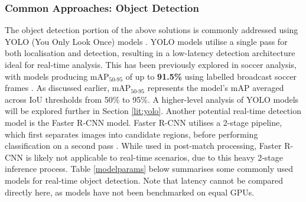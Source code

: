 \subsubsection{Common Approaches: Object Detection}
\label{subsubsec:object}
The object detection portion of the above solutions is commonly addressed using YOLO (You Only Look Once) models \cite{Redmon_2016_CVPR}. YOLO models utilise a single pass for both localisation and detection, resulting in a low-latency detection architecture ideal for real-time analysis. This has been previously explored in soccer analysis, with models producing $\text{mAP}_{50\text{-}95}$ of up to \textbf{91.5\%} using labelled broadcast soccer frames \cite{footandball}. As discussed earlier, $\text{mAP}_{50\text{-}95}$ represents the model's $\text{mAP}$ averaged across IoU thresholds from 50\% to 95\%. A higher-level analysis of YOLO models will be explored further in Section \ref{lit:yolo}. Another potential real-time detection model is the Faster R-CNN model. Faster R-CNN utilises a 2-stage pipeline, which first separates images into candidate regions, before performing classification on a second pass \cite{7485869}. While used in post-match processing, Faster R-CNN is likely not applicable to real-time scenarios, due to this heavy 2-stage inference process. Table \ref{modelparams} below summarises some commonly used models for real-time object detection. Note that latency cannot be compared directly here, as models have not been benchmarked on equal GPUs.

